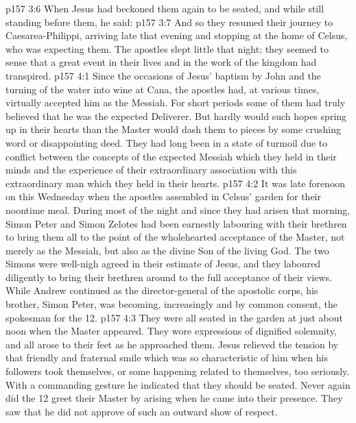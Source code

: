 \vs p157 3:6 When Jesus had beckoned them again to be seated, and while still standing before them, he said: 
\vs p157 3:7 And so they resumed their journey to Caesarea\hyp{}Philippi, arriving late that evening and stopping at the home of Celsus, who was expecting them. The apostles slept little that night; they seemed to sense that a great event in their lives and in the work of the kingdom had transpired.
\vs p157 4:1 Since the occasions of Jesus’ baptism by John and the turning of the water into wine at Cana, the apostles had, at various times, virtually accepted him as the Messiah. For short periods some of them had truly believed that he was the expected Deliverer. But hardly would such hopes spring up in their hearts than the Master would dash them to pieces by some crushing word or disappointing deed. They had long been in a state of turmoil due to conflict between the concepts of the expected Messiah which they held in their minds and the experience of their extraordinary association with this extraordinary man which they held in their hearts.
\vs p157 4:2 It was late forenoon on this Wednesday when the apostles assembled in Celsus’ garden for their noontime meal. During most of the night and since they had arisen that morning, Simon Peter and Simon Zelotes had been earnestly labouring with their brethren to bring them all to the point of the wholehearted acceptance of the Master, not merely as the Messiah, but also as the divine Son of the living God. The two Simons were well\hyp{}nigh agreed in their estimate of Jesus, and they laboured diligently to bring their brethren around to the full acceptance of their views. While Andrew continued as the director\hyp{}general of the apostolic corps, his brother, Simon Peter, was becoming, increasingly and by common consent, the spokesman for the 12.
\vs p157 4:3 They were all seated in the garden at just about noon when the Master appeared. They wore expressions of dignified solemnity, and all arose to their feet as he approached them. Jesus relieved the tension by that friendly and fraternal smile which was so characteristic of him when his followers took themselves, or some happening related to themselves, too seriously. With a commanding gesture he indicated that they should be seated. Never again did the 12 greet their Master by arising when he came into their presence. They saw that he did not approve of such an outward show of respect.
